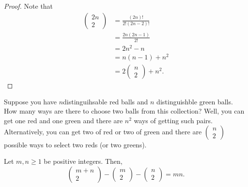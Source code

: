 \begin{proof}
Note that 
\begin{align*}
\left(\begin{array}{c}
2n\\
2
\end{array}\right) & =\frac{\left(2n\right)!}{2!\left(2n-2\right)!}\\
 & =\frac{2n\left(2n-1\right)}{2!}\\
 & =2n^{2}-n\\
 & =n(n-1)+n^{2}\\
 & =2\left(\begin{array}{c}
n\\
2
\end{array}\right)+n^{2}.
\end{align*}
\end{proof}
\begin{rem*}
Suppose you have $n$distinguihsable red balls and $n$ distinguishble
green balls. How many ways are there to choose two balls from this
collection? Well, you can get one red and one green and there are
$n^{2}$ ways of getting such pairs. Alternatively, you can get two
of red or two of green and there are $\left(\begin{array}{c}
n\\
2
\end{array}\right)$ possible ways to select two reds (or two greens).
\end{rem*}
\begin{prop}
\label{prop:mdmActivity95}Let $m,n\geq1$ be positive integers. Then,
\[
\left(\begin{array}{c}
m+n\\
2
\end{array}\right)-\left(\begin{array}{c}
m\\
2
\end{array}\right)-\left(\begin{array}{c}
n\\
2
\end{array}\right)=mn.
\]
\end{prop}

